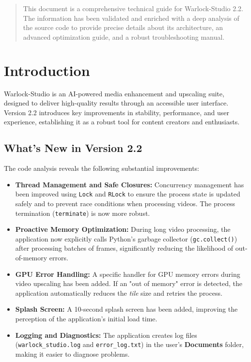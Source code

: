 \documentclass[11pt, a4paper]{article}
\begin{document}
\begin{abstract}
\noindent %
This document is a comprehensive technical guide for Warlock-Studio 2.2. The information has been validated and enriched with a deep analysis of the source code to provide precise details about its architecture, an advanced optimization guide, and a robust troubleshooting manual.
\end{abstract}

\newpage %
\tableofcontents %
\newpage %



\section{Introduction}
Warlock-Studio is an AI-powered media enhancement and upscaling suite, designed to deliver high-quality results through an accessible user interface. Version 2.2 introduces key improvements in stability, performance, and user experience, establishing it as a robust tool for content creators and enthusiasts.

\subsection{What's New in Version 2.2}
The code analysis reveals the following substantial improvements:
\begin{itemize}[leftmargin=*]
    \item \textbf{Thread Management and Safe Closures:} Concurrency management has been improved using \texttt{Lock} and \texttt{RLock} to ensure the process state is updated safely and to prevent race conditions when processing videos. The process termination (\texttt{terminate}) is now more robust.
    \item \textbf{Proactive Memory Optimization:} During long video processing, the application now explicitly calls Python's garbage collector (\texttt{gc.collect()}) after processing batches of frames, significantly reducing the likelihood of out-of-memory errors.
    \item \textbf{GPU Error Handling:} A specific handler for GPU memory errors during video upscaling has been added. If an "out of memory" error is detected, the application automatically reduces the \textit{tile} size and retries the process.
    \item \textbf{Splash Screen:} A 10-second splash screen has been added, improving the perception of the application's initial load time.
    \item \textbf{Logging and Diagnostics:} The application creates log files (\texttt{warlock\_studio.log} and \texttt{error\_log.txt}) in the user's \textbf{Documents} folder, making it easier to diagnose problems.
\end{itemize}
\end{document}
